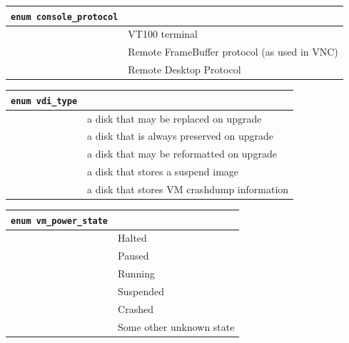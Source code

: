 \vspace{1cm}
\begin{longtable}{|ll|}
\hline
{\tt enum console\_protocol} & \\
\hline
\hspace{0.5cm}{\tt vt100} & VT100 terminal \\
\hspace{0.5cm}{\tt rfb} & Remote FrameBuffer protocol (as used in VNC) \\
\hspace{0.5cm}{\tt rdp} & Remote Desktop Protocol \\
\hline
\end{longtable}

\vspace{1cm}
\begin{longtable}{|ll|}
\hline
{\tt enum vdi\_type} & \\
\hline
\hspace{0.5cm}{\tt system} & a disk that may be replaced on upgrade \\
\hspace{0.5cm}{\tt user} & a disk that is always preserved on upgrade \\
\hspace{0.5cm}{\tt ephemeral} & a disk that may be reformatted on upgrade \\
\hspace{0.5cm}{\tt suspend} & a disk that stores a suspend image \\
\hspace{0.5cm}{\tt crashdump} & a disk that stores VM crashdump information \\
\hline
\end{longtable}

\vspace{1cm}
\begin{longtable}{|ll|}
\hline
{\tt enum vm\_power\_state} & \\
\hline
\hspace{0.5cm}{\tt Halted} & Halted \\
\hspace{0.5cm}{\tt Paused} & Paused \\
\hspace{0.5cm}{\tt Running} & Running \\
\hspace{0.5cm}{\tt Suspended} & Suspended \\
\hspace{0.5cm}{\tt Crashed} & Crashed \\
\hspace{0.5cm}{\tt Unknown} & Some other unknown state \\
\hline
\end{longtable}

